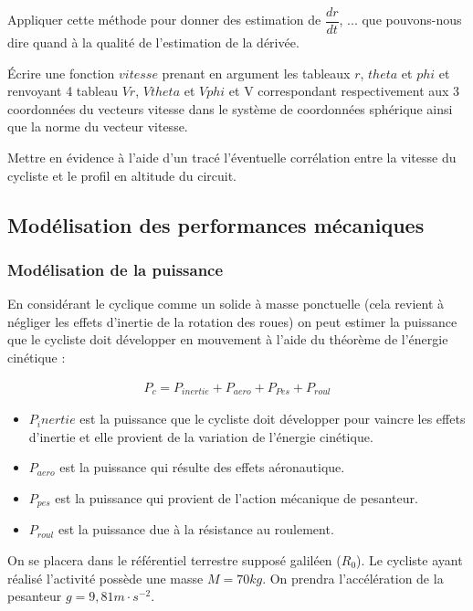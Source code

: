 \question{} Appliquer cette méthode pour donner des estimation de $\dfrac{dr}{dt}$, ... que pouvons-nous dire quand à la qualité de l'estimation de la dérivée.

\question{} Écrire une fonction $vitesse$ prenant en argument les tableaux $r$, $theta$ et $phi$ et renvoyant 4 tableau $Vr$, $Vtheta$ et $Vphi$ et V correspondant respectivement aux 3 coordonnées du vecteurs vitesse dans le système de coordonnées sphérique ainsi que la norme du vecteur vitesse.

\question{} Mettre en évidence à l'aide d'un tracé l'éventuelle corrélation entre la vitesse du cycliste et le profil en altitude du circuit.



\subsection{Modélisation des performances mécaniques}
\subsubsection{Modélisation de la puissance}

En considérant le cyclique comme un solide à masse ponctuelle (cela revient à négliger les effets d'inertie de la rotation des roues) on peut estimer la puissance que le cycliste doit développer en mouvement à l'aide du théorème de l'énergie cinétique : 

\begin{align*}
P_c=P_{inertie}+P_{aero}+P_{Pes}+P_{roul}
\end{align*}

\begin{itemize}
\item $P_inertie$ est la puissance que le cycliste doit développer pour vaincre les effets d'inertie et elle provient de la variation de l'énergie cinétique. 
\item $P_{aero}$ est la puissance qui résulte des effets aéronautique.
\item $P_{pes}$ est la puissance qui provient de l'action mécanique de pesanteur.
\item $P_{roul}$ est la puissance due à la résistance au roulement.
\end{itemize}

On se placera dans le référentiel terrestre supposé galiléen ($R_0$). Le cycliste ayant réalisé l'activité possède une masse $M=70kg$. On prendra l'accélération de la pesanteur $g=9,81m\cdot s^{-2}$.

